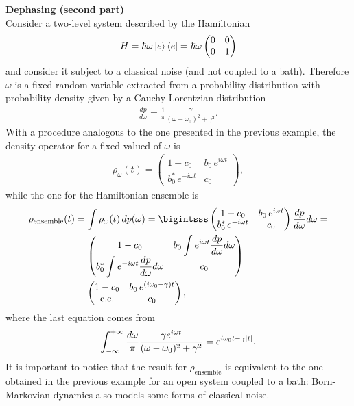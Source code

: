 \begin{tcolorbox} 
\textbf{Dephasing (second part)} \\ 
Consider a two-level system described by the Hamiltonian
\begin{align*}
    H = \hbar \omega \ket{e}\bra{e} = \hbar \omega \begin{pmatrix} 0 & 0 \\ 0 & 1 \end{pmatrix} 
\end{align*}
and consider it subject to a classical noise (and not coupled to a bath). Therefore $\omega$ is a fixed random variable extracted from a probability distribution with probability density given by a Cauchy-Lorentzian distribution
\begin{align*}
    \frac{d p}{d \omega} = \frac{1}{\pi} \frac{\gamma}{(\omega - \omega_0)^2 + \gamma^2}. 
\end{align*}
With a procedure analogous to the one presented in the previous example, the density operator for a fixed valued of $\omega$ is
\begin{align*}
    \rho_\omega(t) = \begin{pmatrix} 1-c_0 & b_0 \, e^{i\omega t} \\ b_0^* \, e^{- i\omega t} & c_0 \end{pmatrix},
\end{align*}
while the one for the Hamiltonian ensemble is 
\begin{align*}
    \rho_\text{ensemble}(t) &= \int \rho_\omega(t) \, dp(\omega) = \bigintsss \begin{pmatrix} 1-c_0 & b_0 \, e^{i\omega t} \\ b_0^* \, e^{- i\omega t} & c_0 \end{pmatrix} \frac{dp}{d\omega} d\omega = \\
    &= \begin{pmatrix} 1-c_0 & b_0 \displaystyle \int e^{i\omega t} \dfrac{dp}{d\omega} d \omega \\ b_0^* \displaystyle \int e^{-i\omega t} \dfrac{dp}{d\omega} d \omega & c_0 \end{pmatrix} = \\
    &=  \begin{pmatrix} 1-c_0 & b_0 \, e^{(i\omega_0-\gamma) t} \\ \text{c.c.} & c_0 \end{pmatrix},
\end{align*}
where the last equation comes from 
\begin{align*}
    \int_{-\infty}^{+\infty} \frac{d \omega}{\pi} \frac{\gamma e^{i \omega t}}{(\omega - \omega_0)^2 + \gamma^2} = e^{i \omega_0 t - \gamma \abs{t}}.
\end{align*}
It is important to notice that the result for $\rho_\text{ensemble}$ is equivalent to the one obtained in the previous example for an open system coupled to a bath: Born-Markovian dynamics also models some forms of classical noise. 
\end{tcolorbox}

